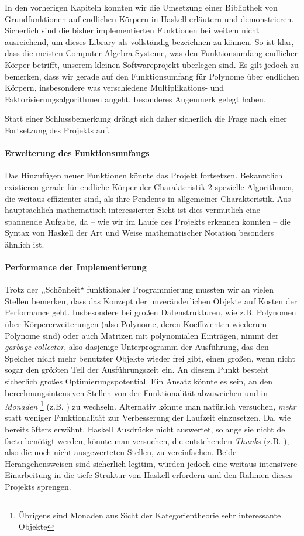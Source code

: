 In den vorherigen Kapiteln konnten wir die Umsetzung einer Bibliothek von
Grundfunktionen auf endlichen Körpern in Haskell erläutern und demonstrieren.
Sicherlich sind die bisher implementierten Funktionen bei weitem nicht
ausreichend, um dieses Library als vollständig bezeichnen zu können. So ist
klar, dass die meisten Computer-Algebra-Systeme, was den Funktionsumfang
endlicher Körper betrifft, unserem kleinen Softwareprojekt überlegen
sind. Es gilt jedoch zu bemerken, dass wir gerade auf den Funktionsumfang für 
Polynome über endlichen Körpern, insbesondere was verschiedene
Multiplikations- und Faktorisierungsalgorithmen angeht, besonderes Augenmerk
gelegt haben.

Statt einer Schlussbemerkung drängt sich daher sicherlich die Frage nach einer
Fortsetzung des Projekts auf.

\paragraph{Erweiterung des Funktionsumfangs} Das Hinzufügen neuer
Funktionen könnte das Projekt fortsetzen. 
Bekanntlich existieren gerade für endliche Körper der Charakteristik 2 
spezielle Algorithmen, die weitaus effizienter sind, als ihre Pendents in
allgemeiner Charakteristik. Aus hauptsächlich
mathematisch interessierter Sicht ist dies vermutlich eine spannende
Aufgabe, da -- wie wir im Laufe des Projekts erkennen konnten -- die Syntax von
Haskell der Art und Weise mathematischer Notation besonders ähnlich ist.

\paragraph{Performance der Implementierung} Trotz der ,,Schönheit`` funktionaler
Programmierung mussten wir an vielen Stellen bemerken, dass das Konzept der
unveränderlichen Objekte auf Kosten der Performance geht. Insbesondere bei
großen Datenstrukturen, wie z.B. Polynomen über Körpererweiterungen (also
Polynome, deren Koeffizienten wiederum Polynome sind) oder auch Matrizen mit
polynomialen Einträgen, nimmt der \emph{garbage collector}, also dasjenige
Unterprogramm der Ausführung, das den Speicher nicht mehr benutzter Objekte
wieder frei gibt, einen großen, wenn nicht sogar den größten Teil der
Ausführungszeit ein. An diesem Punkt besteht sicherlich großes
Optimierungspotential. Ein Ansatz könnte es sein, an den berechnungsintensiven
Stellen von der Funktionalität abzuweichen und in \emph{Monaden}%
\footnote{Übrigens sind Monaden aus Sicht der Kategorientheorie sehr
interessante Objekte}
(z.B. \autocite{haskellwiki:monaden}) zu wechseln. Alternativ könnte man
natürlich versuchen, \emph{mehr} statt weniger Funktionalität
zur Verbesserung der Laufzeit einzusetzen. Da, wie bereits öfters erwähnt,
Haskell Ausdrücke nicht auswertet, solange sie nicht de facto benötigt werden,
könnte man versuchen, die entstehenden \emph{Thunk}s 
(z.B. \autocite{haskellwiki:thunk}), also die noch nicht ausgewerteten Stellen,
zu vereinfachen. Beide Herangehensweisen sind sicherlich legitim, würden 
jedoch eine weitaus intensivere Einarbeitung in die tiefe Struktur von Haskell
erfordern und den Rahmen dieses Projekts sprengen. 

